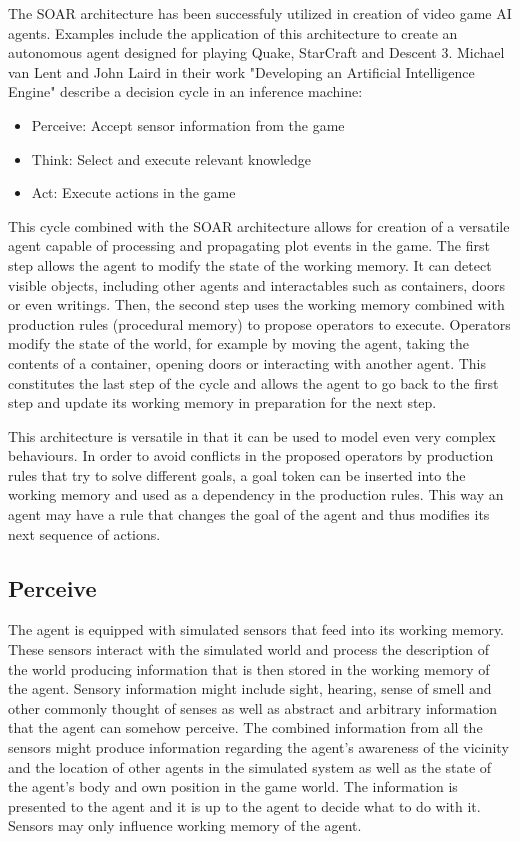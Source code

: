 The SOAR architecture has been successfuly utilized in creation of video game AI agents.
Examples include the application of this architecture to create an autonomous agent designed for playing Quake\cite{laird2001knows}, StarCraft\cite{turner2013soar-sc} and Descent 3\cite{van1999developing}.
Michael van Lent and John Laird in their work "Developing an Artificial Intelligence Engine"\cite{van1999developing} describe a decision cycle in an inference machine:

\begin{itemize}
    \item Perceive: Accept sensor information from the game
    \item Think: Select and execute relevant knowledge
    \item Act: Execute actions in the game
\end{itemize}

This cycle combined with the SOAR architecture allows for creation of a versatile agent capable of processing and propagating plot events in the game.
The first step allows the agent to modify the state of the working memory.
It can detect visible objects, including other agents and interactables such as containers, doors or even writings.
Then, the second step uses the working memory combined with production rules (procedural memory) to propose operators to execute.
Operators modify the state of the world, for example by moving the agent, taking the contents of a container, opening doors or interacting with another agent.
This constitutes the last step of the cycle and allows the agent to go back to the first step and update its working memory in preparation for the next step.

This architecture is versatile in that it can be used to model even very complex behaviours.
In order to avoid conflicts in the proposed operators by production rules that try to solve different goals, a goal token can be inserted into the working memory and used as a dependency in the production rules.
This way an agent may have a rule that changes the goal of the agent and thus modifies its next sequence of actions.

\subsection{Perceive}

The agent is equipped with simulated sensors that feed into its working memory.
These sensors interact with the simulated world and process the description of the world producing information that is then stored in the working memory of the agent.
Sensory information might include sight, hearing, sense of smell and other commonly thought of senses as well as abstract and arbitrary information that the agent can somehow perceive.
The combined information from all the sensors might produce information regarding the agent's awareness of the vicinity and the location of other agents in the simulated system as well as the state of the agent's body and own position in the game world.
The information is presented to the agent and it is up to the agent to decide what to do with it.
Sensors may only influence working memory of the agent.


